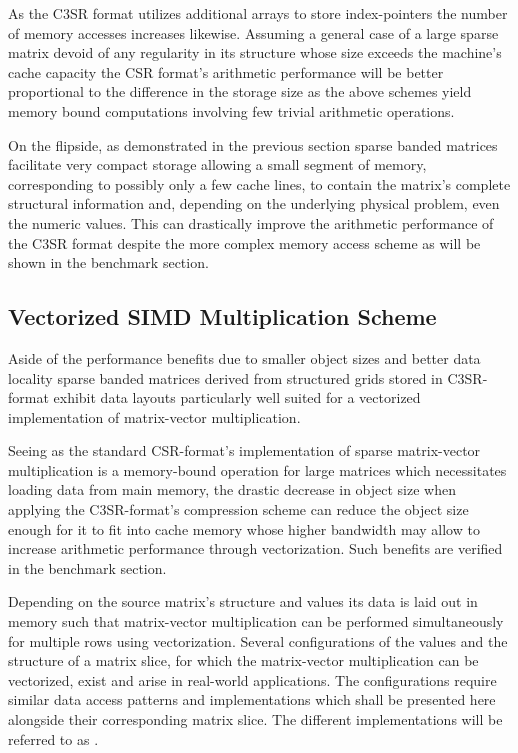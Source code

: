       As the C3SR format utilizes additional arrays to store index-pointers the number of memory accesses increases
      likewise. Assuming a general case of a large sparse matrix devoid of any regularity in its structure whose size
      exceeds the machine's cache capacity the CSR format's arithmetic performance will be better proportional to the
      difference in the storage size as the above schemes yield memory bound computations involving few trivial
      arithmetic operations.

      On the flipside, as demonstrated in the previous section sparse banded matrices facilitate very compact storage
      allowing a small segment of memory, corresponding to possibly only a few cache lines, to contain the matrix's
      complete structural information and, depending on the underlying physical problem, even the numeric values. This
      can drastically improve the arithmetic performance of the C3SR format despite the more complex memory access
      scheme as will be shown in the benchmark section.

    \subsection{Vectorized SIMD Multiplication Scheme} \label{subsubsec:vectorized-simd-multiplication-scheme}

      Aside of the performance benefits due to smaller object sizes and better data locality sparse banded matrices
      derived from structured grids stored in C3SR-format exhibit data layouts particularly well suited for a vectorized
      implementation of matrix-vector multiplication.

      Seeing as the standard CSR-format's implementation of sparse matrix-vector multiplication is a memory-bound
      operation for large matrices which necessitates loading data from main memory, the drastic decrease in object size
      when applying the C3SR-format's compression scheme can reduce the object size enough for it to fit into cache
      memory whose higher bandwidth may allow to increase arithmetic performance through vectorization. Such
      benefits are verified in the benchmark section.

      Depending on the source matrix's structure and values its data is laid out in memory such that matrix-vector
      multiplication can be performed simultaneously for multiple rows using vectorization. Several configurations of
      the values and the structure of a matrix slice, for which the matrix-vector multiplication can be vectorized,
      exist and arise in real-world applications. The configurations require similar data access patterns and
      implementations which shall be presented here alongside their corresponding matrix slice. The different
      implementations will be referred to as .

